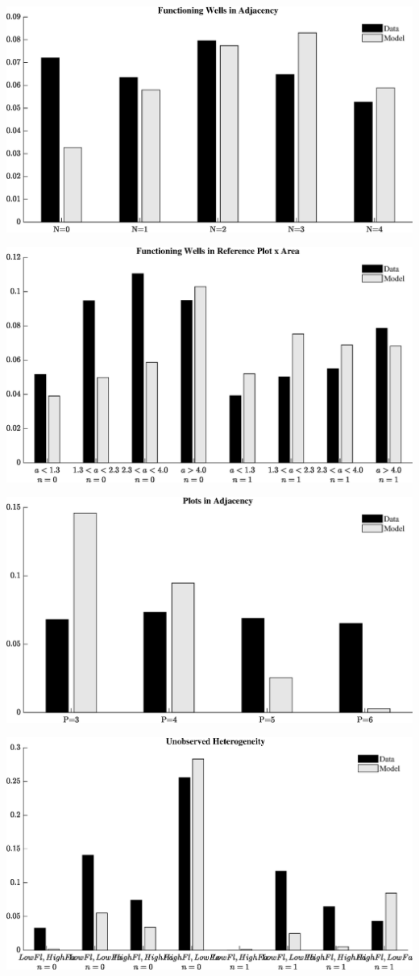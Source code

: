 \documentclass[hidelinks,12pt]{article}
\title{}
\author{}
\begin{document}
\newpage
\begin{center}
\includegraphics[scale=0.8]{model_fit2.eps}
\end{center}
\begin{center}
\includegraphics[scale=0.8]{model_fit3.eps}
\end{center}
\begin{center}
\includegraphics[scale=0.8]{model_fit4.eps}
\end{center}
\begin{center}
\includegraphics[scale=0.8]{model_fit5.eps}
\end{center}
\end{document}
